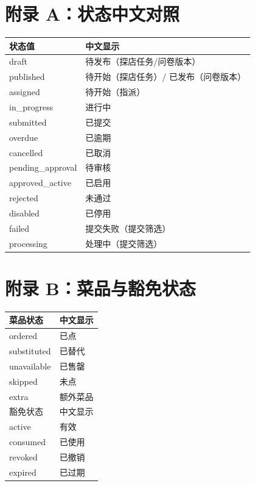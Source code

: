 \documentclass[12pt,a4paper,fontset=none]{ctexart}
\begin{document}
\appendix

\section{附录 A：状态中文对照}

\begin{center}
\begin{tabular}{ll}
\toprule
状态值 & 中文显示 \\
\midrule
draft & 待发布（探店任务/问卷版本） \\
published & 待开始（探店任务）/ 已发布（问卷版本） \\
assigned & 待开始（指派） \\
in\_progress & 进行中 \\
submitted & 已提交 \\
overdue & 已逾期 \\
cancelled & 已取消 \\
pending\_approval & 待审核 \\
approved\_active & 已启用 \\
rejected & 未通过 \\
disabled & 已停用 \\
failed & 提交失败（提交筛选） \\
processing & 处理中（提交筛选） \\
\bottomrule
\end{tabular}
\end{center}

\section{附录 B：菜品与豁免状态}

\begin{center}
\begin{tabular}{ll}
\toprule
菜品状态 & 中文显示 \\
\midrule
ordered & 已点 \\
substituted & 已替代 \\
unavailable & 已售罄 \\
skipped & 未点 \\
extra & 额外菜品 \\
\midrule
豁免状态 & 中文显示 \\
\midrule
active & 有效 \\
consumed & 已使用 \\
revoked & 已撤销 \\
expired & 已过期 \\
\bottomrule
\end{tabular}
\end{center}
\end{document}
